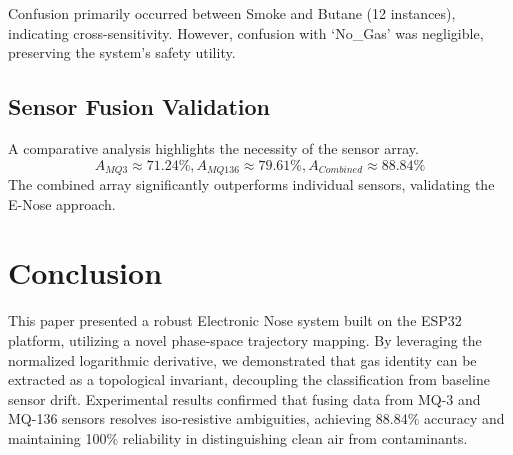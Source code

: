 \documentclass[conference]{IEEEtran}
\begin{document}
Confusion primarily occurred between Smoke and Butane (12 instances), indicating cross-sensitivity. However, confusion with `No\_Gas' was negligible, preserving the system's safety utility.

\subsection{Sensor Fusion Validation}
A comparative analysis highlights the necessity of the sensor array.
\begin{equation}
A_{MQ3} \approx 71.24\%, A_{MQ136} \approx 79.61\%, A_{Combined} \approx 88.84\%
\end{equation}
The combined array significantly outperforms individual sensors, validating the E-Nose approach.

\section{Conclusion}
This paper presented a robust Electronic Nose system built on the ESP32 platform, utilizing a novel phase-space trajectory mapping. By leveraging the normalized logarithmic derivative, we demonstrated that gas identity can be extracted as a topological invariant, decoupling the classification from baseline sensor drift. Experimental results confirmed that fusing data from MQ-3 and MQ-136 sensors resolves iso-resistive ambiguities, achieving 88.84\% accuracy and maintaining 100\% reliability in distinguishing clean air from contaminants.
\end{document}
